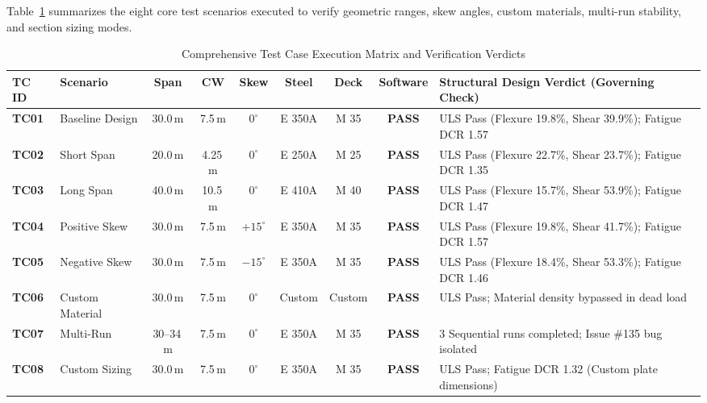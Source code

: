\documentclass[11pt,a4paper]{article}
\begin{document}
Table~\ref{tab:test_matrix} summarizes the eight core test scenarios executed to verify geometric ranges, skew angles, custom materials, multi-run stability, and section sizing modes.

\begin{table}[H]
\centering
\scriptsize
\setlength{\tabcolsep}{3.5pt}
\renewcommand{\arraystretch}{1.2}
\caption{Comprehensive Test Case Execution Matrix and Verification Verdicts}
\label{tab:test_matrix}
\begin{tabularx}{\textwidth}{l p{2.1cm} c c c c c c X}
\toprule
\textbf{TC ID} & \textbf{Scenario} & \textbf{Span} & \textbf{CW} & \textbf{Skew} & \textbf{Steel} & \textbf{Deck} & \textbf{Software} & \textbf{Structural Design Verdict (Governing Check)} \\
\midrule
\textbf{TC01} & Baseline Design & 30.0\,m & 7.5\,m & $0^\circ$ & E 350A & M 35 & \textbf{PASS} & ULS Pass (Flexure 19.8\%, Shear 39.9\%); Fatigue DCR 1.57 \\
\textbf{TC02} & Short Span & 20.0\,m & 4.25\,m & $0^\circ$ & E 250A & M 25 & \textbf{PASS} & ULS Pass (Flexure 22.7\%, Shear 23.7\%); Fatigue DCR 1.35 \\
\textbf{TC03} & Long Span & 40.0\,m & 10.5\,m & $0^\circ$ & E 410A & M 40 & \textbf{PASS} & ULS Pass (Flexure 15.7\%, Shear 53.9\%); Fatigue DCR 1.47 \\
\textbf{TC04} & Positive Skew & 30.0\,m & 7.5\,m & $+15^\circ$ & E 350A & M 35 & \textbf{PASS} & ULS Pass (Flexure 19.8\%, Shear 41.7\%); Fatigue DCR 1.57 \\
\textbf{TC05} & Negative Skew & 30.0\,m & 7.5\,m & $-15^\circ$ & E 350A & M 35 & \textbf{PASS} & ULS Pass (Flexure 18.4\%, Shear 53.3\%); Fatigue DCR 1.46 \\
\textbf{TC06} & Custom Material & 30.0\,m & 7.5\,m & $0^\circ$ & Custom & Custom & \textbf{PASS} & ULS Pass; Material density bypassed in dead load \\
\textbf{TC07} & Multi-Run & 30--34\,m & 7.5\,m & $0^\circ$ & E 350A & M 35 & \textbf{PASS} & 3 Sequential runs completed; Issue \#135 bug isolated \\
\textbf{TC08} & Custom Sizing & 30.0\,m & 7.5\,m & $0^\circ$ & E 350A & M 35 & \textbf{PASS} & ULS Pass; Fatigue DCR 1.32 (Custom plate dimensions) \\
\bottomrule
\end{tabularx}
\end{table}
\end{document}
